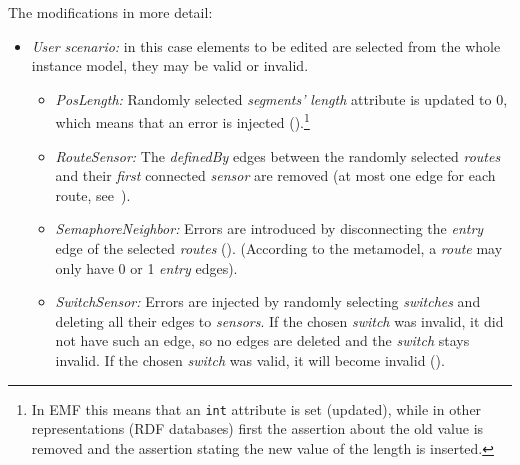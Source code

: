 The modifications in more detail:
\begin{itemize}
  \item \emph{User scenario:} in this case elements to be edited are selected from the whole instance model, \ie they may be valid or invalid. 
  \begin{itemize}
    
    \item \emph{PosLength:} Randomly selected \emph{segments'} \emph{length} attribute is updated to 0, which means that an error is injected ().\footnote{In EMF this means that an \texttt{int} attribute is set (updated), while in other representations (\eg RDF databases) first the assertion about the old value is removed and the assertion stating the new value of the length is inserted.}
    
    \item \emph{RouteSensor:} The \emph{definedBy} edges between the randomly selected \emph{routes} and their \emph{first} connected \emph{sensor} are removed (at most one edge for each route, see~).
    
    \item \emph{SemaphoreNeighbor:} Errors are introduced by disconnecting the \emph{entry} edge of the selected \emph{routes} (). (According to the metamodel, a \emph{route} may only have 0 or 1 \emph{entry} edges).

    \item \emph{SwitchSensor:} Errors are injected by randomly selecting \emph{switches} and deleting all their edges to \emph{sensors}. If the chosen \emph{switch} was invalid, it did not have such an edge, so no edges are deleted and the \emph{switch} stays invalid. If the chosen \emph{switch} was valid, it will become invalid ().
        
\end{itemize}
  

\end{itemize}
